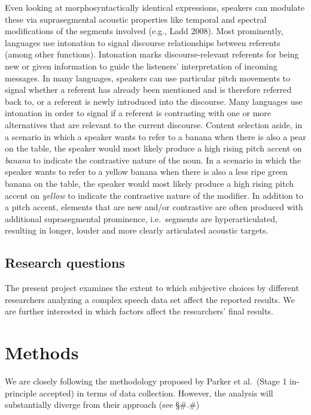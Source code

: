 \documentclass[
  12pt,
]{article}
\begin{document}
Even looking at morphosyntactically identical expressions, speakers can modulate these via suprasegmental acoustic properties like temporal and spectral modifications of the segments involved (e.g., Ladd 2008).
Most prominently, languages use intonation to signal discourse relationships between referents (among other functions).
Intonation marks discourse-relevant referents for being new or given information to guide the listeners' interpretation of incoming messages.
In many languages, speakers can use particular pitch movements to signal whether a referent has already been mentioned and is therefore referred back to, or a referent is newly introduced into the discourse.
Many languages use intonation in order to signal if a referent is contrasting with one or more alternatives that are relevant to the current discourse.
Content selection aside, in a scenario in which a speaker wants to refer to a banana when there is also a pear on the table, the speaker would most likely produce a high rising pitch accent on \emph{banana} to indicate the contrastive nature of the noun.
In a scenario in which the speaker wants to refer to a yellow banana when there is also a less ripe green banana on the table, the speaker would most likely produce a high rising pitch accent on \emph{yellow} to indicate the contrastive nature of the modifier.
In addition to a pitch accent, elements that are new and/or contrastive are often produced with additional suprasegmental prominence, i.e.~segments are hyperarticulated, resulting in longer, louder and more clearly articulated acoustic targets.

\hypertarget{research-questions}{%
\subsection{Research questions}\label{research-questions}}

The present project examines the extent to which subjective choices by different researchers analyzing a complex speech data set affect the reported results.
We are further interested in which factors affect the researchers' final results.

\hypertarget{methods}{%
\section{Methods}\label{methods}}

We are closely following the methodology proposed by Parker et al.~(Stage 1 in-principle accepted) in terms of data collection.
However, the analysis will substantially diverge from their approach (see §\#.\#)
\end{document}
